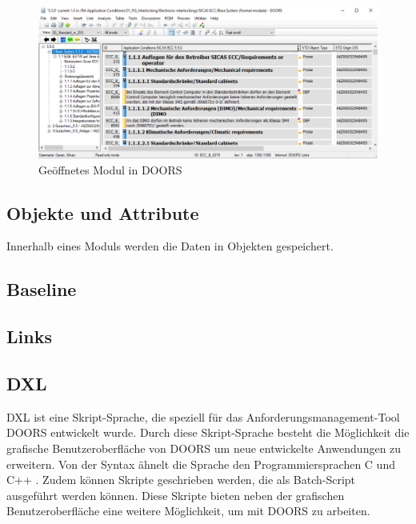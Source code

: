 \begin{figure}[h]
    \centering
    \includegraphics[width = \textwidth]{abbildungen/Modul in Doors.PNG}
    \caption{Geöffnetes Modul in \acs{DOORS}}
    \label{fig:Modul Doors}
\end{figure}


\subsection{Objekte und Attribute}
Innerhalb eines Moduls werden die Daten in Objekten gespeichert.
\subsection{Baseline}

\subsection{Links}

\subsection{DXL}

\ac*{DXL} ist eine Skript-Sprache, die speziell für das Anforderungsmanagement-Tool \acs{DOORS} entwickelt wurde. Durch diese Skript-Sprache
besteht die Möglichkeit die grafische Benutzeroberfläche von \acs{DOORS} um neue entwickelte Anwendungen zu
erweitern. Von der Syntax ähnelt die Sprache den Programmiersprachen C und C++ \cite[S.1]{DXL}. Zudem können Skripte geschrieben werden,
die als Batch-Script ausgeführt werden können. Diese Skripte bieten neben der grafischen Benutzeroberfläche eine weitere Möglichkeit, 
um mit \acs{DOORS} zu arbeiten. 
